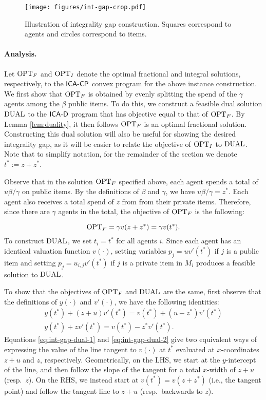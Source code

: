 \begin{figure}
\centering
\texttt{[image: figures/int-gap-crop.pdf]}
\caption{{\small Illustration of integrality gap construction. Squares correspond to agents and circles correspond to items.}}
\label{fig:int-gap}
\end{figure}

\paragraph{Analysis.} Let $\mathrm{OPT}_F$ and $\mathrm{OPT}_I$ denote 
the optimal fractional and integral solutions, respectively, to the $\mathsf{ICA\text{-}CP}$ convex program for the above instance construction. 
We first show that $\mathrm{OPT}_F$ is obtained by evenly splitting the spend of the $\gamma$ agents among the $\beta$ public items. 
To do this, we construct a feasible dual solution $\mathrm{DUAL}$ to the $\mathsf{ICA\text{-}D}$ program that has objective equal to that of $\mathrm{OPT}_F$.
By Lemma \ref{lem:duality}, it  then follows $\mathrm{OPT}_F$ is an optimal fractional solution. 
Constructing this dual solution will also be useful for showing the desired integrality gap, as it will be easier to relate the objective of $\mathrm{OPT}_I$ to $\mathrm{DUAL}$. Note that to simplify notation, for the remainder of the section we denote $t^* := z + z^*$. 

Observe that in the solution $\mathrm{OPT}_F$ specified above, each agent spends a total of $u\beta/\gamma$ on public items.
By the definitions of $\beta$ and $\gamma$, we have $u\beta/\gamma = z^*$.  Each agent also receives a total spend of $z$ from from their private items.  
Therefore, since there are $\gamma$ agents in the total, the objective of $\mathrm{OPT}_F$ is the following:

\begin{equation}
\label{eq:int-gap-opt}
\mathrm{OPT}_F = \gamma v(z+z^*) = \gamma v(t^*).
\end{equation}
To construct $\mathrm{DUAL}$,  we set $t_i = t^*$ for all agents $i$. 
Since each agent has an identical valuation function $v(\cdot)$, setting variables $p_j = u v'(t^*)$ if $j$ is a public item and setting $p_j = u_{i,j}v'(t^*)$ if $j$ is a private item in $M_i$ produces a feasible solution to $\mathrm{DUAL}$.

To show that the objectives of $\mathrm{OPT}_F$ and $\mathrm{DUAL}$ are the same, first observe that the definitions of $y(\cdot)$ and $v'(\cdot)$, we have the following identities: 
\begin{gather} 
\label{eq:int-gap-dual-1}
y(t^*) + (z+u)v'(t^*) = v(t^*) + (u-z^*)v'(t^*) \\
\label{eq:int-gap-dual-2}
y(t^*) + zv'(t^*) = v(t^*) - z^*v'(t^*).
\end{gather}
 Equations \eqref{eq:int-gap-dual-1} and \eqref{eq:int-gap-dual-2} give two equivalent ways of expressing the value  
of the line tangent to $v(\cdot)$ at $t^*$ evaluated at $x$-coordinates $z+u$ and $z$, respectively. Geometrically, on the LHS, we start at the $y$-intercept of the line, 
and then follow the slope of the tangent for a total $x$-width of $z+u$ (resp.\ $z$). On the RHS, we instead start at $v(t^*) = v(z+z^*)$ (i.e., the tangent point)
and follow the tangent line to $z+u$ (resp.\ backwards to $z$). 



